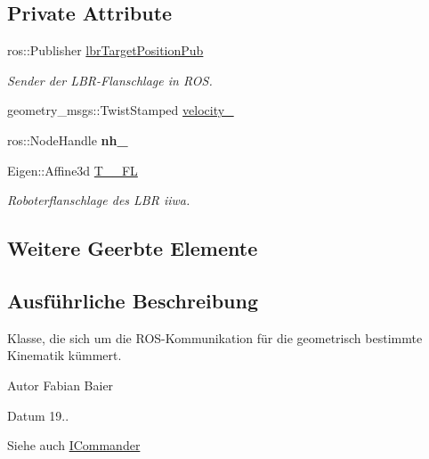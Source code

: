 \subsection*{Private Attribute}
\begin{DoxyCompactItemize}
\item 
\hypertarget{classGeometricKinematicCommander_ab2d3302d1b9cdad6bc363403811b6e5e}{ros\-::\-Publisher \hyperlink{classGeometricKinematicCommander_ab2d3302d1b9cdad6bc363403811b6e5e}{lbr\-Target\-Position\-Pub}}\label{classGeometricKinematicCommander_ab2d3302d1b9cdad6bc363403811b6e5e}

\begin{DoxyCompactList}\small\item\em Sender der L\-B\-R-\/\-Flanschlage in R\-O\-S. \end{DoxyCompactList}\item 
geometry\-\_\-msgs\-::\-Twist\-Stamped \hyperlink{classGeometricKinematicCommander_afbfee50f578ff4098026413f41b916a3}{velocity\-\_\-}
\item 
\hypertarget{classGeometricKinematicCommander_a9aa4841981737548fa4dc94d7ddec84a}{ros\-::\-Node\-Handle {\bfseries nh\-\_\-}}\label{classGeometricKinematicCommander_a9aa4841981737548fa4dc94d7ddec84a}

\item 
\hypertarget{classGeometricKinematicCommander_ae58f3ee72e4ff68fe5d4e720e42cddbc}{Eigen\-::\-Affine3d \hyperlink{classGeometricKinematicCommander_ae58f3ee72e4ff68fe5d4e720e42cddbc}{T\-\_\-\_\-\-F\-L}}\label{classGeometricKinematicCommander_ae58f3ee72e4ff68fe5d4e720e42cddbc}

\begin{DoxyCompactList}\small\item\em Roboterflanschlage des L\-B\-R iiwa. \end{DoxyCompactList}\end{DoxyCompactItemize}
\subsection*{Weitere Geerbte Elemente}


\subsection{Ausführliche Beschreibung}
Klasse, die sich um die R\-O\-S-\/\-Kommunikation für die geometrisch bestimmte Kinematik kümmert. 

\begin{DoxyAuthor}{Autor}
Fabian Baier 
\end{DoxyAuthor}
\begin{DoxyDate}{Datum}
19.. 
\end{DoxyDate}
\begin{DoxySeeAlso}{Siehe auch}
\hyperlink{classICommander}{I\-Commander} 
\end{DoxySeeAlso}


